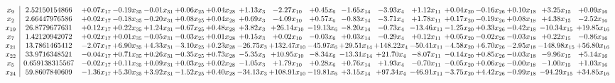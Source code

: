 \documentclass[9pt]{article}
\begin{document}
 \[\begin{array}{c| c c@{\hskip 2pt} c@{\hskip 2pt} c@{\hskip 2pt} c@{\hskip 2pt} c@{\hskip 2pt} c@{\hskip 2pt} c@{\hskip 2pt} c@{\hskip 2pt} c@{\hskip 2pt} c@{\hskip 2pt} c@{\hskip 2pt} c@{\hskip 2pt} c@{\hskip 2pt} c@{\hskip 2pt} c@{\hskip 2pt} c@{\hskip 2pt} }
 x_{9}   &  2.52150154866 & +  0.07 x_{17} & -0.19 x_{35} & -0.01 x_{31} & +  0.06 x_{25} & +  0.04 x_{28} & +  1.13 x_{3} & -2.27 x_{10} & +  0.45 x_{6} & -1.65 x_{14} & -3.93 x_{4} & +  1.12 x_{11} & +  0.04 x_{20} & -0.16 x_{26} & +  0.10 x_{18} & +  3.25 x_{15} & +  0.09 x_{16}\\
 x_{2}   &  2.66447976586 & +  0.02 x_{17} & -0.18 x_{35} & -0.20 x_{31} & +  0.08 x_{25} & +  0.04 x_{28} & +  0.69 x_{3} & -4.09 x_{10} & +  0.57 x_{6} & -0.83 x_{14} & -3.71 x_{4} & +  1.78 x_{11} & +  0.17 x_{20} & -0.19 x_{26} & +  0.08 x_{18} & +  4.38 x_{15} & -2.52 x_{16}\\
 x_{19}   &  26.8779677631 & +  0.12 x_{17} & +  0.22 x_{35} & +  1.24 x_{31} & -0.67 x_{25} & +  0.48 x_{28} & +  3.82 x_{3} & + 26.14 x_{10} & -19.13 x_{6} & -8.20 x_{14} & -0.73 x_{4} & -13.46 x_{11} & -1.25 x_{20} & +  0.33 x_{26} & -0.42 x_{18} & -10.34 x_{15} & + 19.85 x_{16}\\
 x_{7}   &  1.42120942072 & +  0.02 x_{17} & +  0.01 x_{35} & -0.05 x_{31} & -0.03 x_{25} & +  0.01 x_{28} & +  0.15 x_{3} & +  0.02 x_{10} & -0.03 x_{6} & +  0.03 x_{14} & -0.29 x_{4} & +  0.12 x_{11} & +  0.05 x_{20} & -0.02 x_{26} & -0.03 x_{18} & +  0.22 x_{15} & -0.86 x_{16}\\
 x_{21}   &  13.7861465412 & -2.07 x_{17} & +  6.90 x_{35} & +  4.33 x_{31} & -3.10 x_{25} & +  0.23 x_{28} & -26.75 x_{3} & + 132.47 x_{10} & -45.97 x_{6} & + 29.51 x_{14} & + 148.22 x_{4} & -50.41 x_{11} & -4.58 x_{20} & +  6.70 x_{26} & -2.95 x_{18} & -148.98 x_{15} & + 56.80 x_{16}\\
 x_{22}   &  33.9716348521 & -0.04 x_{17} & +  0.71 x_{35} & +  0.26 x_{31} & -0.35 x_{25} & +  0.73 x_{28} & -5.35 x_{3} & + 10.95 x_{10} & -8.34 x_{6} & -13.31 x_{14} & + 21.70 x_{4} & -8.07 x_{11} & -0.14 x_{20} & +  0.85 x_{26} & -0.03 x_{18} & -9.96 x_{15} & +  5.14 x_{16}\\
 x_{5}   &  0.659138315567 & -0.02 x_{17} & +  0.11 x_{35} & +  0.09 x_{31} & +  0.03 x_{25} & +  0.02 x_{28} & -1.05 x_{3} & +  1.79 x_{10} & +  0.28 x_{6} & +  0.76 x_{14} & +  1.93 x_{4} & -0.70 x_{11} & -0.05 x_{20} & +  0.06 x_{26} & -0.00 x_{18} & -1.00 x_{15} & +  1.03 x_{16}\\
 x_{24}   &  59.8607840609 & -1.36 x_{17} & +  5.30 x_{35} & +  3.92 x_{31} & -1.52 x_{25} & +  0.40 x_{28} & -34.13 x_{3} & + 108.91 x_{10} & -19.81 x_{6} & +  3.15 x_{14} & + 97.34 x_{4} & -46.91 x_{11} & -3.75 x_{20} & +  4.42 x_{26} & -0.99 x_{18} & -94.29 x_{15} & + 34.85 x_{16}\\

\end{array}\]
\end{document}
